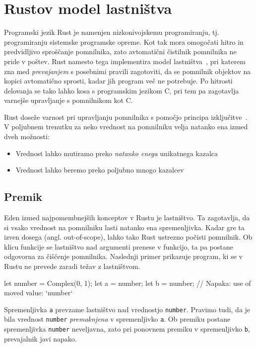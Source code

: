 \section{Rustov model lastništva}

Programski jezik Rust je namenjen nizkonivojskemu programiranju, tj. programiranju sistemske programske opreme. Kot tak mora omogočati hitro in predvidljivo sproščanje pomnilnika, zato avtomatični čistilnik pomnilnika ne pride v poštev. Rust namesto tega implementira model lastništva~\cite{klabnik2023rust}, pri katerem zna med \textit{prevajanjem} s posebnimi pravili zagotoviti, da se pomnilnik objektov na kopici avtomatično sprosti, kadar jih program več ne potrebuje. Po hitrosti delovanja se tako lahko kosa s programskim jezikom C, pri tem pa zagotavlja varnejše upravljanje s pomnilnikom kot C.

Rust doseže varnost pri upravljanju pomnilnika s pomočjo principa izključitve~\cite{Jung}. V poljubnem trenutku za neko vrednost na pomnilniku velja natanko ena izmed dveh možnosti:

\begin{itemize}
	\itemsep 0em
	\item Vrednost lahko mutiramo preko \textit{natanko enega} unikatnega kazalca
	\item Vrednost lahko beremo preko poljubno mnogo kazalcev
\end{itemize}

\subsection{Premik}

Eden izmed najpomembnejših konceptov v Rustu je lastništvo. Ta zagotavlja, da si vsako vrednost na pomnilniku lasti natanko ena spremenljivka. Kadar gre ta izven dosega (angl. out-of-scope), lahko tako Rust ustrezno počisti pomnilnik. Ob klicu funkcije se lastništvo nad argumenti prenese v funkcijo, ta pa postane odgovorna za čiščenje pomnilnika. Naslednji primer prikazuje program, ki se v Rustu ne prevede zaradi težav z lastništvom.

\begin{rust-failure}
let number = Complex(0, 1);
let a = number;
let b = number;  // Napaka: use of moved value: `number`
\end{rust-failure}

Spremenljivka \texttt{a} prevzame lastništvo nad vrednostjo \texttt{number}. Pravimo tudi, da je bila vrednost \texttt{number} \textit{premaknjena} v spremenljivko \texttt{a}. Ob premiku postane spremenljivka \texttt{number} neveljavna, zato pri ponovnem premiku v spremenljivko \texttt{b}, prevajalnik javi napako.

